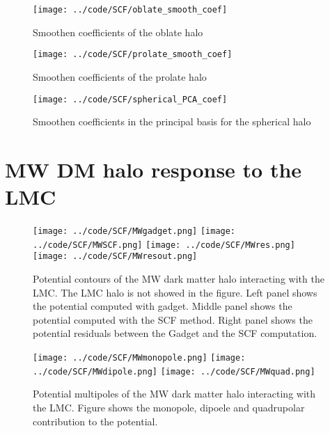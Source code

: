 \documentclass[12pt]{article}
\begin{document}
\begin{figure}[H]
\centering
\texttt{[image: ../code/SCF/oblate\_smooth\_coef]}
\caption{Smoothen coefficients of the oblate halo}
\end{figure}


\begin{figure}[H]
\centering
\texttt{[image: ../code/SCF/prolate\_smooth\_coef]}
\caption{Smoothen coefficients of the prolate halo}
\end{figure}

\begin{figure}[H]
\centering
\texttt{[image: ../code/SCF/spherical\_PCA\_coef]}
\caption{Smoothen coefficients in the principal basis
for the spherical halo}
\end{figure}



\section{MW DM halo response to the LMC}


\begin{figure}[H]
\centering
{}
\texttt{[image: ../code/SCF/MWgadget.png]}
\endminipage
{}
\texttt{[image: ../code/SCF/MWSCF.png]}
\endminipage
{}
\texttt{[image: ../code/SCF/MWres.png]}
\endminipage
{}
\texttt{[image: ../code/SCF/MWresout.png]}
\endminipage
\caption{Potential contours of the MW dark matter
halo interacting with the LMC. The LMC halo is not showed
in the figure. Left panel shows the potential computed with
gadget. Middle panel shows the potential computed with the 
SCF method. Right panel shows the potential residuals between
the Gadget and the SCF computation.\label{fig:coeffMW}}
\end{figure}


\begin{figure}[H]
\centering
{}
\texttt{[image: ../code/SCF/MWmonopole.png]}
\endminipage
{}
\texttt{[image: ../code/SCF/MWdipole.png]}
\endminipage
{}
\texttt{[image: ../code/SCF/MWquad.png]}
\endminipage
\caption{Potential multipoles of the MW dark matter
halo interacting with the LMC. Figure shows the monopole,
dipoele and quadrupolar contribution to the potential.}
\end{figure}
\end{document}

